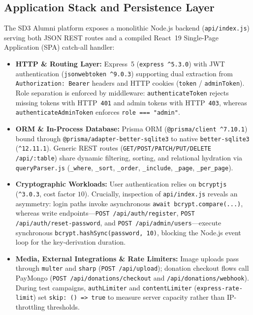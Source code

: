 \documentclass[11pt,letterpaper]{article}
\begin{document}
\subsection{Application Stack and Persistence Layer}
The SD3 Alumni platform exposes a monolithic Node.js backend (\texttt{api/index.js}) serving both JSON REST routes and a compiled React~19 Single-Page Application (SPA) catch-all handler:
\begin{itemize}
  \item \textbf{HTTP \& Routing Layer:} Express~5 (\texttt{express \^{}5.3.0}) with JWT authentication (\texttt{jsonwebtoken \^{}9.0.3}) supporting dual extraction from \texttt{Authorization: Bearer} headers and HTTP cookies (\texttt{token} / \texttt{adminToken}). Role separation is enforced by middleware: \texttt{authenticateToken} rejects missing tokens with HTTP~\texttt{401} and admin tokens with HTTP~\texttt{403}, whereas \texttt{authenticateAdmin\-Token} enforces \texttt{role === "admin"}.
  \item \textbf{ORM \& In-Process Database:} Prisma ORM (\texttt{@prisma/client \^{}7.10.1}) bound through \texttt{@prisma/adapter-better-sqlite3} to native \texttt{better-sqlite3} (\texttt{\^{}12.11.1}). Generic REST routes (\texttt{GET/\allowbreak POST/\allowbreak PATCH/\allowbreak PUT/\allowbreak DELETE /api/:table}) share dynamic filtering, sorting, and relational hydration via \texttt{queryParser.js} (\texttt{\_where}, \texttt{\_sort}, \texttt{\_order}, \texttt{\_include}, \texttt{\_page}, \texttt{\_per\_page}).
  \item \textbf{Cryptographic Workloads:} User authentication relies on \texttt{bcryptjs} (\texttt{\^{}3.0.3}, cost factor $10$). Crucially, inspection of \texttt{api/index.js} reveals an asymmetry: login paths invoke asynchronous \texttt{await bcrypt.compare(...)}, whereas write endpoints—\texttt{POST /\allowbreak api/\allowbreak auth/\allowbreak register}, \texttt{POST /\allowbreak api/\allowbreak auth/\allowbreak reset-password}, and \texttt{POST /\allowbreak api/\allowbreak admin/\allowbreak users}—execute synchronous \texttt{bcrypt.hashSync(password, 10)}, blocking the Node.js event loop for the key-derivation duration.
  \item \textbf{Media, External Integrations \& Rate Limiters:} Image uploads pass through \texttt{multer} and \texttt{sharp} (\texttt{POST /\allowbreak api/\allowbreak upload}); donation checkout flows call PayMongo (\texttt{POST /\allowbreak api/\allowbreak donations/\allowbreak checkout} and \texttt{/\allowbreak api/\allowbreak donations/\allowbreak webhook}). During test campaigns, \texttt{authLimiter} and \texttt{contentLimiter} (\texttt{express-rate-limit}) set \texttt{skip: () => true} to measure server capacity rather than IP-throttling thresholds.
\end{itemize}
\end{document}
